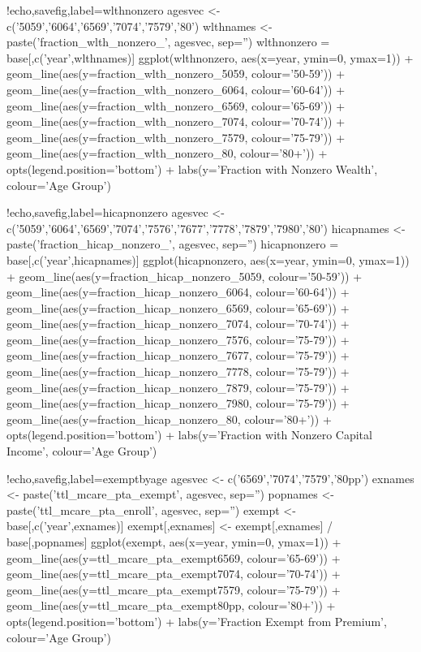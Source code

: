 \documentclass{article}
\begin{document}
\begin{Rcode}{!echo,savefig,label=wlthnonzero}
agesvec <- c('5059','6064','6569','7074','7579','80')
wlthnames <- paste('fraction_wlth_nonzero_', agesvec, sep='')
wlthnonzero = base[,c('year',wlthnames)]
ggplot(wlthnonzero, aes(x=year, ymin=0, ymax=1)) +
geom_line(aes(y=fraction_wlth_nonzero_5059, colour='50-59')) + 
geom_line(aes(y=fraction_wlth_nonzero_6064, colour='60-64')) + 
geom_line(aes(y=fraction_wlth_nonzero_6569, colour='65-69')) +
geom_line(aes(y=fraction_wlth_nonzero_7074, colour='70-74')) +
geom_line(aes(y=fraction_wlth_nonzero_7579, colour='75-79')) +
geom_line(aes(y=fraction_wlth_nonzero_80, colour='80+')) +
opts(legend.position='bottom') +
labs(y='Fraction with Nonzero Wealth', colour='Age Group')
\end{Rcode}

\begin{Rcode}{!echo,savefig,label=hicapnonzero}
agesvec <- c('5059','6064','6569','7074','7576','7677','7778','7879','7980','80')
hicapnames <- paste('fraction_hicap_nonzero_', agesvec, sep='')
hicapnonzero = base[,c('year',hicapnames)]
ggplot(hicapnonzero, aes(x=year, ymin=0, ymax=1)) +
geom_line(aes(y=fraction_hicap_nonzero_5059, colour='50-59')) + 
geom_line(aes(y=fraction_hicap_nonzero_6064, colour='60-64')) + 
geom_line(aes(y=fraction_hicap_nonzero_6569, colour='65-69')) +
geom_line(aes(y=fraction_hicap_nonzero_7074, colour='70-74')) +
geom_line(aes(y=fraction_hicap_nonzero_7576, colour='75-79')) +
geom_line(aes(y=fraction_hicap_nonzero_7677, colour='75-79')) +
geom_line(aes(y=fraction_hicap_nonzero_7778, colour='75-79')) +
geom_line(aes(y=fraction_hicap_nonzero_7879, colour='75-79')) +
geom_line(aes(y=fraction_hicap_nonzero_7980, colour='75-79')) +
geom_line(aes(y=fraction_hicap_nonzero_80, colour='80+')) +
opts(legend.position='bottom') +
labs(y='Fraction with Nonzero Capital Income', colour='Age Group')
\end{Rcode}

\begin{Rcode}{!echo,savefig,label=exemptbyage}
agesvec <- c('6569','7074','7579','80pp')
exnames <- paste('ttl_mcare_pta_exempt', agesvec, sep='')
popnames <- paste('ttl_mcare_pta_enroll', agesvec, sep='')
exempt <- base[,c('year',exnames)]
exempt[,exnames] <- exempt[,exnames] / base[,popnames]
ggplot(exempt, aes(x=year, ymin=0, ymax=1)) +
geom_line(aes(y=ttl_mcare_pta_exempt6569, colour='65-69')) +
geom_line(aes(y=ttl_mcare_pta_exempt7074, colour='70-74')) +
geom_line(aes(y=ttl_mcare_pta_exempt7579, colour='75-79')) +
geom_line(aes(y=ttl_mcare_pta_exempt80pp, colour='80+')) +
opts(legend.position='bottom') +
labs(y='Fraction Exempt from Premium', colour='Age Group')
\end{Rcode}
\end{document}
